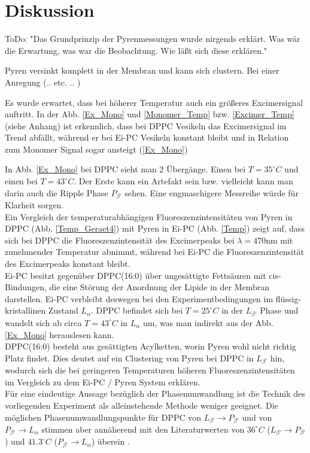 \section{Diskussion}

ToDo: "Das Grundprinzip der Pyrenmessungen  wurde nirgends erklärt. Was wär die Erwartung, was war die Beobachtung. Wie läßt sich diese erklären."

Pyren versinkt komplett in der Membran und kann sich clustern. Bei einer Anregung (.. etc. .. )

Es wurde erwartet, dass bei höherer Temperatur auch ein größeres Excimersignal auftritt. In der Abb. \ref{Ex_Mono} und \ref{Monomer_Temp} 
bzw. \ref{Excimer_Temp} (siehe Anhang) ist erkennlich, dass bei DPPC Vesikeln das Excimersignal im Trend abfällt, während
er bei Ei-PC Vesikeln konstant bleibt und in Relation zum Monomer Signal sogar ansteigt (\ref{Ex_Mono})



In Abb. \ref{Ex_Mono} bei DPPC sieht man 2 Übergänge. Einen bei $T=35^\circ C$ und einen bei  $T=43^\circ C$. Der Erste kann ein Artefakt sein bzw. vielleicht kann man darin auch die Ripple Phase $P_{\beta '}$ sehen. Eine engmaschigere Messreihe würde für Klarheit sorgen.\\
Ein Vergleich der temperaturabhängigen Fluoreszenzintensitäten von Pyren in DPPC (Abb. \ref{Temp_Geraet4}) mit Pyren in Ei-PC (Abb. \ref{Temp})
zeigt auf, dass sich bei DPPC die Fluoreszenzintensität des Excimerpeaks bei $\lambda=470$nm mit zunehmender Temperatur abnimmt, während bei Ei-PC die Fluoreszenzintensität des Excimerpeaks konstant bleibt. \\
Ei-PC  besitzt gegenüber DPPC(16:0) über ungesättigte Fettsäuren mit cis-Bindungen, die eine Störung der Anordnung der Lipide in der Membran darstellen. Ei-PC verbleibt deswegen bei den Experimentbedingungen im flüssig-kristallinen Zustand $L_\alpha$. 
DPPC befindet sich bei $T=25^\circ C$ in der $L_{\beta '}$ Phase und wandelt sich ab circa $T=43^\circ C$ in $L_\alpha$ um, was man indirekt aus der Abb. \ref{Ex_Mono} herauslesen kann. \\
 DPPC(16:0) besteht aus gesättigten Acylketten, worin Pyren wohl nicht richtig Platz findet. Dies deutet auf ein Clustering von Pyren bei DPPC in $L_{\beta '}$ hin, wodurch sich die bei geringeren Temperaturen höheren Fluoreszenzintensitäten im Vergleich zu dem Ei-PC / Pyren System erklären. \\
Für eine eindeutige Aussage bezüglich der Phasenumwandlung ist die Technik  des vorliegenden Experiment als alleinstehende Methode weniger geeignet. Die möglichen Phasenumwandlungspunkte für DPPC von $L_{\beta '} \rightarrow P_{\beta '}$ und von $P_{\beta '} \rightarrow L_\alpha$ stimmen aber annäherend mit den Literaturwerten von $36^\circ C$ ($L_{\beta '} \rightarrow P_{\beta '}$) und $41.3^\circ C$ ($P_{\beta '} \rightarrow L_\alpha$) überein \cite{Biltonen1993}.\\


